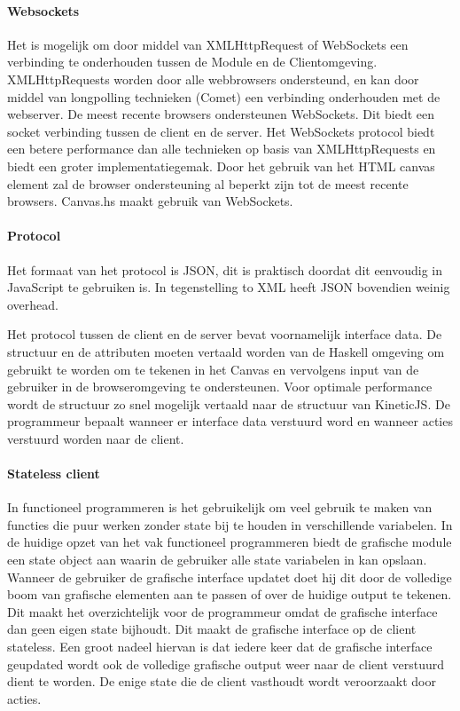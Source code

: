 \paragraph{Websockets}
Het is mogelijk om door middel van XMLHttpRequest of WebSockets een verbinding te onderhouden tussen de Module en de Clientomgeving. XMLHttpRequests worden door alle webbrowsers ondersteund, en kan door middel van longpolling technieken (Comet) een verbinding onderhouden met de webserver. De meest recente browsers ondersteunen WebSockets. Dit biedt een socket verbinding tussen de client en de server. Het WebSockets protocol biedt een betere performance dan alle technieken op basis van XMLHttpRequests en biedt een groter implementatiegemak. Door het gebruik van het HTML canvas element zal de browser ondersteuning al beperkt zijn tot de meest recente browsers. Canvas.hs maakt gebruik van WebSockets.

\paragraph{Protocol}
Het formaat van het protocol is JSON, dit is praktisch doordat dit eenvoudig in JavaScript te gebruiken is. In tegenstelling to XML heeft JSON bovendien weinig overhead.

Het protocol tussen de client en de server bevat voornamelijk interface data. De structuur en de attributen moeten vertaald worden van de Haskell omgeving om gebruikt te worden om te tekenen in het Canvas en vervolgens input van de gebruiker in de browseromgeving te ondersteunen. Voor optimale performance wordt de structuur zo snel mogelijk vertaald naar de structuur van KineticJS. De programmeur bepaalt wanneer er interface data verstuurd word en wanneer acties verstuurd worden naar de client.

\paragraph{Stateless client}
In functioneel programmeren is het gebruikelijk om veel gebruik te maken van functies die puur werken zonder state bij te houden in verschillende variabelen. In de huidige opzet van het vak functioneel programmeren biedt de grafische module een state object aan waarin de gebruiker alle state variabelen in kan opslaan. Wanneer de gebruiker de grafische interface updatet doet hij dit door de volledige boom van grafische elementen aan te passen of over de huidige output te tekenen. Dit maakt het overzichtelijk voor de programmeur omdat de grafische interface dan geen eigen state bijhoudt. Dit maakt de grafische interface op de client stateless. Een groot nadeel hiervan is dat iedere keer dat de grafische interface geupdated wordt ook de volledige grafische output weer naar de client verstuurd dient te worden. De enige state die de client vasthoudt wordt veroorzaakt door acties.

